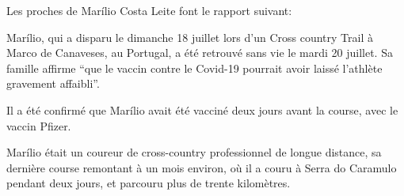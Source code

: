 Les proches de Marílio Costa Leite font le rapport suivant:

Marílio, qui a disparu le dimanche 18 juillet lors d'un Cross country Trail à
Marco de Canaveses, au Portugal, a été retrouvé sans vie le mardi 20 juillet. Sa
famille affirme “que le vaccin contre le Covid-19 pourrait avoir laissé
l'athlète gravement affaibli”.

Il a été confirmé que Marílio avait été vacciné deux jours avant la course, avec
le vaccin Pfizer.

Marílio était un coureur de cross-country professionnel de longue distance, sa
dernière course remontant à un mois environ, où il a couru à Serra do Caramulo
pendant deux jours, et parcouru plus de trente kilomètres.

